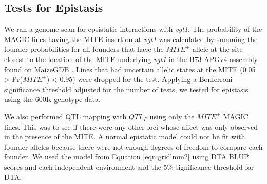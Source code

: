 \documentclass[article,9pt,twocolumn,twoside]{rilabRxiv}
\newcommand{\jri}[1]{{\small \textcolor{red}{#1}}}
\begin{document}

\subsection{Tests for Epistasis}
We ran a genome scan for epsistatic interactions with \emph{vgt1}.
The probability of the MAGIC lines having the MITE insertion at \emph{vgt1} was calculated by summing the founder probabilities for all founders that have the $MITE^+$ allele at the site closest to the location of the MITE underlying \emph{vgt1} in the B73 APGv4 assembly found on MaizeGDB \citep{Portwood}.
Lines that had uncertain allelic states at the MITE (0.05 > Pr($MITE^+$) < 0.95) were dropped for the test.
Applying a Bonferroni significance threshold adjusted for the number of tests, we tested for epistasis using the 600K genotype data.

We also performed QTL mapping with $QTL_F$ using only the $MITE^+$ MAGIC lines.
This was to see if there were any other loci whose affect was only observed in the presence of the MITE.
A normal epistatic model could not be fit with founder alleles because there were not enough degrees of freedom to compare each founder.
We used the model from Equation \ref{eqn:gridlmm2} using DTA BLUP scores and each independent environment and the 5\% significance threshold for DTA.
\end{document}
